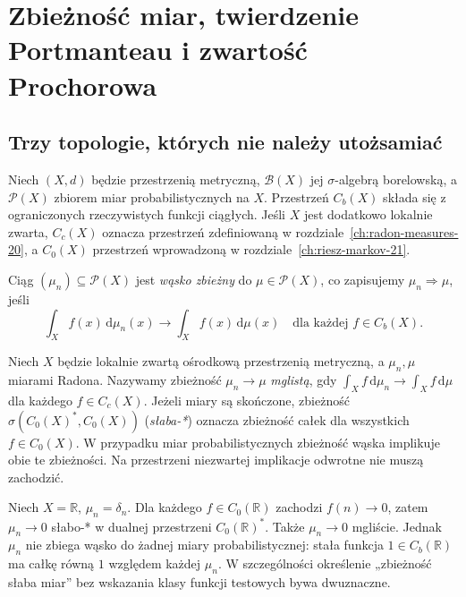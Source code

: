 \chapter[Zbieżność miar i twierdzenie Prochorowa]{Zbieżność miar, twierdzenie Portmanteau i zwartość Prochorowa}
\label{ch:weak-measures-22}

\section{Trzy topologie, których nie należy utożsamiać}
Niech $(X,d)$ będzie przestrzenią metryczną,
$\mathcal B(X)$ jej $\sigma$-algebrą borelowską,
a $\mathcal P(X)$ zbiorem miar probabilistycznych na $X$.
Przestrzeń $C_b(X)$ składa się z ograniczonych rzeczywistych
funkcji ciągłych. Jeśli $X$ jest dodatkowo lokalnie zwarta,
$C_c(X)$ oznacza przestrzeń zdefiniowaną w
rozdziale~\ref{ch:radon-measures-20}, a $C_0(X)$
przestrzeń wprowadzoną w rozdziale~\ref{ch:riesz-markov-21}.

\begin{definicja}
\label{def:narrow-measures-22}
Ciąg $(\mu_n)\subseteq\mathcal P(X)$ jest
\emph{wąsko zbieżny} do $\mu\in\mathcal P(X)$,
co zapisujemy $\mu_n\Rightarrow\mu$, jeśli
\begin{equation}\label{eq:narrow-22}
 \int_X f(x)\,\mathrm d\mu_n(x)
 \longrightarrow\int_X f(x)\,\mathrm d\mu(x)
 \quad\text{dla każdej }f\in C_b(X).
\end{equation}
\end{definicja}

\begin{definicja}
\label{def:vague-weakstar-22}
Niech $X$ będzie lokalnie zwartą ośrodkową przestrzenią
metryczną, a $\mu_n,\mu$ miarami Radona.
Nazywamy zbieżność $\mu_n\to\mu$ \emph{mglistą},
gdy $\int_Xf\,\mathrm d\mu_n\to\int_Xf\,\mathrm d\mu$
dla każdego $f\in C_c(X)$.
Jeżeli miary są skończone, zbieżność
$\sigma(C_0(X)^*,C_0(X))$ (\emph{słaba-*})
oznacza zbieżność całek dla wszystkich $f\in C_0(X)$.
W przypadku miar probabilistycznych zbieżność wąska
implikuje obie te zbieżności. Na przestrzeni niezwartej
implikacje odwrotne nie muszą zachodzić.
\end{definicja}

\begin{przyklad}
\label{ex:mass-escape-22}
Niech $X=\mathbb R$, $\mu_n=\delta_n$.
Dla każdego $f\in C_0(\mathbb R)$ zachodzi $f(n)\to0$,
zatem $\mu_n\to0$ słabo-* w dualnej przestrzeni
$C_0(\mathbb R)^*$. Także $\mu_n\to0$ mgliście.
Jednak $\mu_n$ nie zbiega wąsko do żadnej miary
probabilistycznej: stała funkcja $1\in C_b(\mathbb R)$
ma całkę równą $1$ względem każdej $\mu_n$.
W szczególności określenie „zbieżność słaba miar” bez
wskazania klasy funkcji testowych bywa dwuznaczne.
\end{przyklad}

